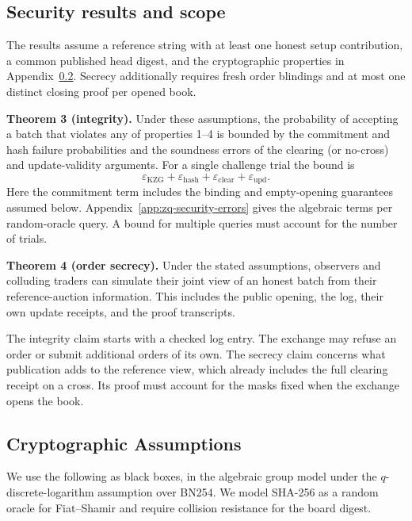 \subsection{Security results and scope}

The results assume a reference string with at least one honest setup contribution, a common published head digest, and the cryptographic properties in Appendix~\ref{app:zq-security-assumptions}. Secrecy additionally requires fresh order blindings and at most one distinct closing proof per opened book.

\textbf{Theorem 3 (integrity).} Under these assumptions, the probability of accepting a batch that violates any of properties 1--4 is bounded by the commitment and hash failure probabilities and the soundness errors of the clearing (or no-cross) and update-validity arguments. For a single challenge trial the bound is
\[
  \varepsilon_{\mathrm{KZG}}+\varepsilon_{\mathrm{hash}}
  +\varepsilon_{\mathrm{clear}}+\varepsilon_{\mathrm{upd}}.
\]
Here the commitment term includes the binding and empty-opening guarantees assumed below. Appendix~\ref{app:zq-security-errors} gives the algebraic terms per random-oracle query. A bound for multiple queries must account for the number of trials.

\textbf{Theorem 4 (order secrecy).} Under the stated assumptions, observers and colluding traders can simulate their joint view of an honest batch from their reference-auction information. This includes the public opening, the log, their own update receipts, and the proof transcripts.

The integrity claim starts with a checked log entry. The exchange may refuse an order or submit additional orders of its own. The secrecy claim concerns what publication adds to the reference view, which already includes the full clearing receipt on a cross. Its proof must account for the masks fixed when the exchange opens the book.

\subsection{Cryptographic Assumptions}
\label{app:zq-security-assumptions}

We use the following as black boxes, in the algebraic group model under the \(q\)-discrete-logarithm assumption over BN254. We model SHA-256 as a random oracle for Fiat--Shamir and require collision resistance for the board digest.

